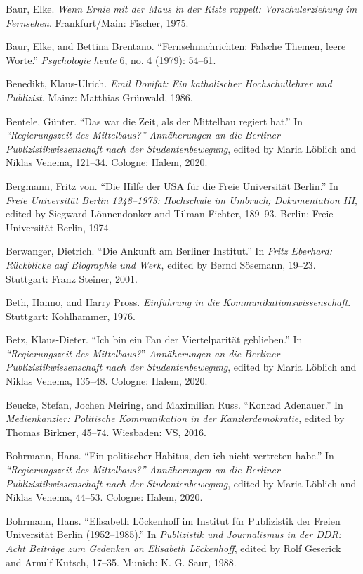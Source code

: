 \documentclass{tufte-handout}
\begin{document}
\begin{hangparas}{.25in}{1}
Baur, Elke. \emph{Wenn Ernie mit der Maus in der Kiste rappelt:
Vorschulerziehung im Fernsehen}. Frankfurt/Main: Fischer, 1975.

Baur, Elke, and Bettina Brentano. ``Fernsehnachrichten: Falsche Themen,
leere Worte.'' \emph{Psychologie heute} 6, no. 4 (1979): 54--61.

Benedikt, Klaus-Ulrich. \emph{Emil Dovifat: Ein katholischer
Hochschullehrer und Publizist}. Mainz: Matthias Grünwald, 1986.

Bentele, Günter. ``Das war die Zeit, als der Mittelbau regiert hat.'' In
\emph{``Regierungszeit des Mittelbaus?'' Annäherungen an die Berliner
Publizistikwissenschaft nach der Studentenbewegung}, edited by Maria
Löblich and Niklas Venema, 121--34. Cologne: Halem, 2020.

Bergmann, Fritz von. ``Die Hilfe der USA für die Freie Universität
Berlin.'' In \emph{Freie Universität Berlin 1948--1973: Hochschule im
Umbruch; Dokumentation III}, edited by Siegward Lönnendonker and Tilman
Fichter, 189--93. Berlin: Freie Universität Berlin, 1974.

Berwanger, Dietrich. ``Die Ankunft am Berliner Institut.'' In
\emph{Fritz Eberhard: Rückblicke auf Biographie und Werk}, edited by
Bernd Sösemann, 19--23. Stuttgart: Franz Steiner, 2001.

Beth, Hanno, and Harry Pross. \emph{Einführung in die
Kommunikationswissenschaft}. Stuttgart: Kohlhammer, 1976.

Betz, Klaus-Dieter. ``Ich bin ein Fan der Viertelparität geblieben.'' In
\emph{``Regierungszeit des Mittelbaus?}'' \emph{Annäherungen an die
Berliner Publizistikwissenschaft nach der Studentenbewegung}, edited by
Maria Löblich and Niklas Venema, 135--48. Cologne: Halem, 2020.

Beucke, Stefan, Jochen Meiring, and Maximilian Russ. ``Konrad
Adenauer.'' In \emph{Medienkanzler: Politische Kommunikation in der
Kanzlerdemokratie}, edited by Thomas Birkner, 45--74. Wiesbaden: VS,
2016.

Bohrmann, Hans. ``Ein politischer Habitus, den ich nicht vertreten
habe.'' In \emph{``Regierungszeit des Mittelbaus?'' Annäherungen an die
Berliner Publizistikwissenschaft nach der Studentenbewegung}, edited by
Maria Löblich and Niklas Venema, 44--53. Cologne: Halem, 2020.

Bohrmann, Hans. ``Elisabeth Löckenhoff im Institut für Publizistik der
Freien Universität Berlin (1952--1985).'' In \emph{Publizistik und
Journalismus in der DDR: Acht Beiträge zum Gedenken an Elisabeth
Löckenhoff}, edited by Rolf Geserick and Arnulf Kutsch, 17--35. Munich:
K. G. Saur, 1988.


\end{hangparas}
\end{document}
